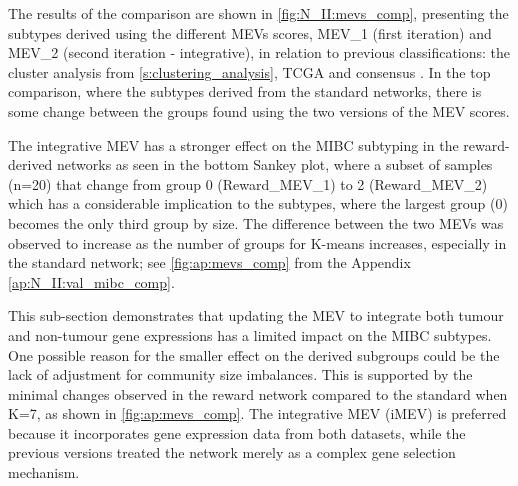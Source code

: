 The results of the comparison are shown in \cref{fig:N_II:mevs_comp}, presenting the subtypes derived using the different MEVs scores, MEV\_1 (first iteration) and MEV\_2 (second iteration - integrative), in relation to previous classifications: the cluster analysis from \cref{s:clustering_analysis}, TCGA and consensus \citep{Robertson2017-mg,Kamoun2020-tj}. In the top comparison, where the subtypes derived from the standard networks, there is some change between the groups found using the two versions of the MEV scores.

The integrative MEV has a stronger effect on the MIBC subtyping in the reward-derived networks as seen in the bottom Sankey plot, where a subset of samples (n=20) that change from group 0 (Reward\_MEV\_1) to 2 (Reward\_MEV\_2) which has a considerable implication to the subtypes, where the largest group (0) becomes the only third group by size. The difference between the two MEVs was observed to increase as the number of groups for K-means increases, especially in the standard network; see \cref{fig:ap:mevs_comp} from the Appendix \cref{ap:N_II:val_mibc_comp}.  

This sub-section demonstrates that updating the MEV to integrate both tumour and non-tumour gene expressions has a limited impact on the MIBC subtypes. One possible reason for the smaller effect on the derived subgroups could be the lack of adjustment for community size imbalances. This is supported by the minimal changes observed in the reward network compared to the standard when K=7, as shown in \cref{fig:ap:mevs_comp}. The integrative MEV (iMEV) is preferred because it incorporates gene expression data from both datasets, while the previous versions treated the network merely as a complex gene selection mechanism.


